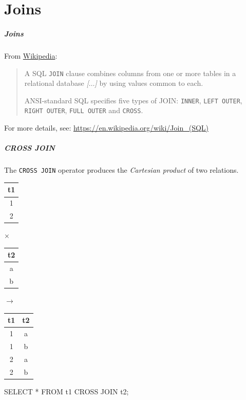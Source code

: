 \documentclass[english,serif,mathserif]{beamer}
\begin{document}
\part{Joins}
\begin{frame}
  \frametitle{Joins}

  From \href{https://en.wikipedia.org/wiki/Join_(SQL)}{Wikipedia}:

  \+
  \begin{quote}
    A SQL \texttt{JOIN} clause combines columns from one or more tables in a
    relational database {\em [$\ldots$]} by using values common to each.

    \+ ANSI-standard SQL specifies five types of JOIN: \texttt{INNER},
    \texttt{LEFT~OUTER}, \texttt{RIGHT~OUTER}, \texttt{FULL~OUTER} and
    \texttt{CROSS}.
  \end{quote}

   \+
   \begin{references}
     For more details, see:
     \url{https://en.wikipedia.org/wiki/Join_(SQL)}
   \end{references}
\end{frame}


\begin{frame}[fragile]
  \frametitle{CROSS JOIN}

  The \texttt{CROSS JOIN} operator produces the \emph{Cartesian product} of two
  relations.

  \begin{center}
    \begin{tabular}{c}
      \textbf{t1}
      \\
      \hline
      1
      \\
      2
    \end{tabular}
    {\color{gray}$\pmb\times$}
    \begin{tabular}{c}
      \textbf{t2}
      \\
      \hline
      a
      \\
      b
    \end{tabular}
    {\color{gray}$\pmb\rightarrow$}
    \begin{tabular}{cc}
      \textbf{t1} & \textbf{t2}
      \\
      \hline
      1 & a
      \\
      1 & b
      \\
      2 & a
      \\
      2 & b
    \end{tabular}

    \+
    \begin{minipage}{32ex}
    \begin{sql}
SELECT * FROM t1 CROSS JOIN t2;
    \end{sql}
  \end{minipage}
  \end{center}
\end{frame}
\end{document}
